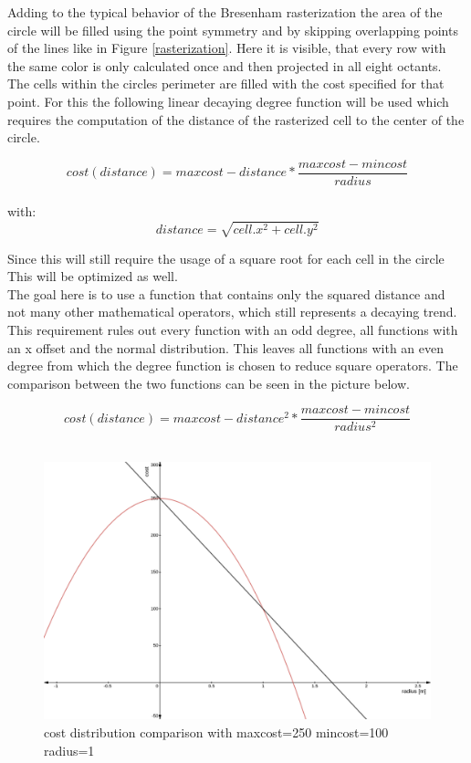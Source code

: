 Adding to the typical behavior of the Bresenham rasterization the area of the circle will be filled using the point symmetry and by skipping overlapping points of the lines like in Figure \ref{rasterization}. Here it is visible, that every row with the same color is only calculated once and then projected in all eight octants. 
The cells within the circles perimeter are filled with the cost specified for that point. For this the following linear decaying  degree function will be used which requires the computation of the distance of the rasterized cell to the center of the circle.

\[cost(distance)=maxcost-distance*\frac{maxcost-mincost}{radius}\]\\
with: \[distance=\sqrt{cell.x^2+cell.y^2}\]

 Since this will still require the usage of a square root for each cell in the circle This will be optimized as well.\\

The goal here is to use a function that contains only the squared distance and not many other mathematical operators, which still represents a decaying trend. This requirement rules out every function with an odd degree, all functions with an x offset and the normal distribution. This leaves all functions with an even degree from which the  degree function is chosen to reduce square operators. The comparison between the two functions can be seen in the picture below.

\[cost(distance)=maxcost-distance^2*\frac{maxcost-mincost}{radius^2}\]\\

\begin{figure}[H]
	\begin{center}
	\includegraphics[width=140mm]{Pictures/linear cost comparison}
	\caption{cost distribution comparison with maxcost=250 mincost=100 radius=1}
	\end{center}
\end{figure}

